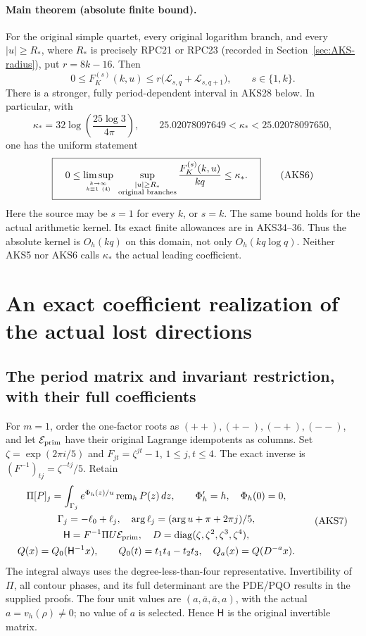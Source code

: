 \documentclass[11pt,a4paper]{article}
\begin{document}
\paragraph{Main theorem (absolute finite bound).}
For the original simple quartet, every original logarithm branch, and
every $|u|\ge R_*$, where $R_*$ is precisely RPC21 or RPC23 (recorded in
Section~\ref{sec:AKS-radius}), put $r=8k-16$. Then
\[
 \boxed{\quad
 0\le F_K^{(s)}(k,u)\le r\bigl(\mathcal L_{s,q}+\mathcal L_{s,q+1}\bigr),
 \qquad s\in\{1,k\}.\quad}
 \tag{AKS4}
\]
There is a stronger, fully period-dependent interval in AKS28 below.
In particular, with
\[
 \kappa_* =32\log\left(\frac{25\log3}{4\pi}\right),
 \qquad 25.02078097649<\kappa_*<25.02078097650,
 \tag{AKS5}
\]
one has the uniform statement
\[
 \boxed{\quad
 0\le\limsup_{k\to\infty\atop k\equiv1\ (4)}
       \ \sup_{\substack{|u|\ge R_*\\\text{original branches}}}
         \frac{F_K^{(s)}(k,u)}{kq}\le\kappa_*.
 \quad}\tag{AKS6}
\]
Here the source may be $s=1$ for every $k$, or $s=k$. The same bound holds
for the actual arithmetic kernel. Its exact finite allowances are in
AKS34--36. Thus the absolute kernel is $O_h(kq)$ on this domain, not only
$O_h(kq\log q)$. Neither AKS5 nor AKS6 calls $\kappa_*$ the actual leading
coefficient.

\section{An exact coefficient realization of the actual lost directions}
\label{sec:AKS-frame}

\subsection{The period matrix and invariant restriction, with their full coefficients}
For $m=1$, order the one-factor roots as $(++),(+-),(-+),(--)$, and let
$\mathcal E_{\rm prim}$ have their original Lagrange idempotents as columns.
Set $\zeta=\exp(2\pi i/5)$ and $F_{jt}=\zeta^{jt}-1$, $1\le j,t\le4$.
The exact inverse is $(F^{-1})_{tj}=\zeta^{-tj}/5$. Retain
\[
\begin{gathered}
 \Pi[P]_j=\int_{\Gamma_j}e^{\Phi_h(z)/u}\operatorname{rem}_hP(z)\,dz,
 \qquad\Phi_h'=h,\quad\Phi_h(0)=0,\\
 \Gamma_j=-\ell_0+\ell_j,\quad
 \arg\ell_j=(\arg u+\pi+2\pi j)/5,\\
 \mathsf H=F^{-1}\Pi U\mathcal E_{\rm prim},\quad
 D=\operatorname{diag}(\zeta,\zeta^2,\zeta^3,\zeta^4),\\
 Q(x)=Q_0(\mathsf H^{-1}x),\qquad
 Q_0(t)=t_1t_4-t_2t_3,\quad Q_a(x)=Q(D^{-a}x).
\end{gathered}\tag{AKS7}
\]
The integral always uses the degree-less-than-four representative.
Invertibility of $\Pi$, all contour phases, and its full determinant are
the PDE/PQO results in the supplied proofs. The four unit values are
$(a,\bar a,\bar a,a)$, with the actual $a=v_h(\rho)\ne0$; no value of $a$
is selected. Hence $\mathsf H$ is the original invertible matrix.
\end{document}
